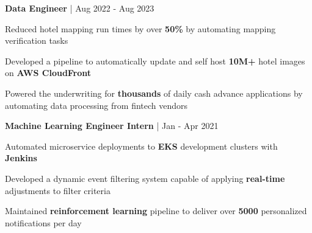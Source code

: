 \begin{cventries}
\cventry
{\textbf{Data Engineer} | \color{awesome}{Super}}
{Aug 2022 - Aug 2023} %
{ %
\begin{cvitems}
\item {Reduced hotel mapping run times by over \textbf{50\%} by automating mapping verification tasks}
\item {Developed a pipeline to automatically update and self host \textbf{10M+} hotel images on \textbf{AWS CloudFront}}
\item {Powered the underwriting for \textbf{thousands} of daily cash advance applications by automating data processing from fintech vendors}
\end{cvitems}
}



\cventry
{\textbf{Machine Learning Engineer Intern} | \color{awesome}{Zynga}}
{Jan - Apr 2021} %
{ %
\begin{cvitems}
\item {Automated microservice deployments to \textbf{EKS} development clusters with \textbf{Jenkins}}
\item{Developed a dynamic event filtering system capable of applying \textbf{real-time} adjustments to filter criteria}
\item {Maintained \textbf{reinforcement learning} pipeline to deliver over \textbf{5000} personalized notifications per day}
\end{cvitems}
}


\end{cventries}
